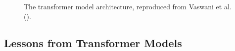 \documentclass[
  12pt,
  letterpaper,
]{scrreport}
\begin{document}
\begin{figure}[t]

\caption{\label{fig-transformermodel}The transformer model architecture,
reproduced from Vaswani et al.
().}


\end{figure}%

\subsection{Lessons from Transformer
Models}\label{lessons-from-transformer-models}
\end{document}

